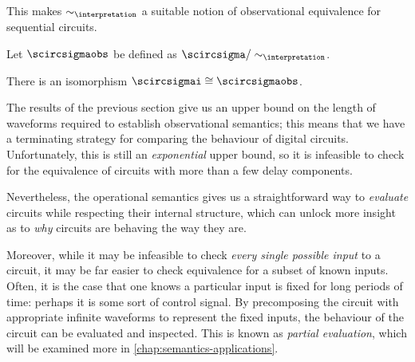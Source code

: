 This makes \(\sim_\interpretation\) a suitable notion of observational
equivalence for sequential circuits.

\begin{definition}
    Let \(\scircsigmaobs\) be defined as
    \(\scircsigma / \sim_{\interpretation}\).
\end{definition}

\begin{corollary}
    There is an isomorphism \(\scircsigmai \cong \scircsigmaobs\).
\end{corollary}

The results of the previous section give us an upper bound on the length of
waveforms required to establish observational semantics; this means that we have
a terminating strategy for comparing the behaviour of digital circuits.
Unfortunately, this is still an \emph{exponential} upper bound, so it is
infeasible to check for the equivalence of circuits with more than a few delay
components.

Nevertheless, the operational semantics gives us a straightforward way to
\emph{evaluate} circuits while respecting their internal structure, which can
unlock more insight as to \emph{why} circuits are behaving the way they
are.

Moreover, while it may be infeasible to check \emph{every single possible input}
to a circuit, it may be far easier to check equivalence for a subset of known
inputs.
Often, it is the case that one knows a particular input is fixed for long
periods of time: perhaps it is some sort of control signal.
By precomposing the circuit with appropriate infinite waveforms to represent the
fixed inputs, the behaviour of the circuit can be evaluated and inspected.
This is known as \emph{partial evaluation}, which will be examined more
in \cref{chap:semantics-applications}.